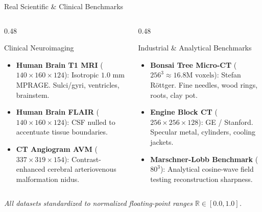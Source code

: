 \documentclass[aspectratio=169,11pt]{beamer}
\begin{document}
\begin{frame}{Real Scientific \& Clinical Benchmarks}
  \begin{columns}[T]
    \begin{column}{0.48\textwidth}
      \begin{block}{Clinical Neuroimaging}
        \begin{itemize}
          \item \textbf{Human Brain T1 MRI} ($140 \times 160 \times 124$):
            Isotropic $1.0\text{ mm}$ MPRAGE. Sulci/gyri, ventricles, brainstem.
          \item \textbf{Human Brain FLAIR} ($140 \times 160 \times 124$):
            CSF nulled to accentuate tissue boundaries.
          \item \textbf{CT Angiogram AVM} ($337 \times 319 \times 154$):
            Contrast-enhanced cerebral arteriovenous malformation nidus.
        \end{itemize}
      \end{block}
    \end{column}

    \begin{column}{0.48\textwidth}
      \begin{block}{Industrial \& Analytical Benchmarks}
        \begin{itemize}
          \item \textbf{Bonsai Tree Micro-CT} ($256^3 \approx 16.8\text{M voxels}$):
            Stefan R\"ottger. Fine needles, wood rings, roots, clay pot.
          \item \textbf{Engine Block CT} ($256 \times 256 \times 128$):
            GE / Stanford. Specular metal, cylinders, cooling jackets.
          \item \textbf{Marschner-Lobb Benchmark} ($80^3$):
            Analytical cosine-wave field testing reconstruction sharpness.
        \end{itemize}
      \end{block}
    \end{column}
  \end{columns}

  \vspace{0.2cm}
  \centering
  \small
  \textit{All datasets standardized to normalized floating-point ranges $\mathbb{R} \in [0.0, 1.0]$.}
\end{frame}
\end{document}
